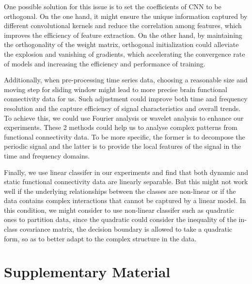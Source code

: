 \documentclass[11pt]{article}
\renewcommand\thesection{\arabic{section}}
\begin{document}
One possible solution for this issue is to set the coefficients of CNN to be orthogonal. On the one hand, it might ensure the unique information captured by different convolutional kernels and reduce the correlation among features, which improves the efficiency of feature extraction. On the other hand, by maintaining the orthogonality of the weight matrix,  orthogonal initialization could alleviate the explosion and vanishing of gradients\cite{Achour2021-rl},  which accelerating the convergence rate of models and increasing the efficiency and performance of training.

Additionally, when pre-processing time series data, choosing a reasonable size and moving step for sliding window might lead to more precise brain functional connectivity data for us. Such adjustment could improve both time and frequency resolution and the capture efficiency of signal characteristics and overall trends\cite{Leiber2023-de}. To achieve this, we could use Fourier analysis\cite{Mantini2007-sv} or wavelet analysis\cite{Medda2016-vh} to enhance our experiments. These 2 methods could help us to analyse complex patterns from functional connectivity data. To be more specific, the former is to decompose the periodic signal and the latter is to provide the local features of the signal in the time and frequency domains\cite{Guo2022-dk}.

Finally, we use linear classifer in our experiments and find that both dynamic and static functional connectivity data are linearly separable. But this might not work well if the underlying relationships between the classes are non-linear or if the data contains complex interactions that cannot be captured by a linear model. In this condition, we might consider to use non-linear classifer such as quadratic ones to partition data, since the quadratic could consider the inequality of the in-class covariance matrix,  the decision boundary is allowed to take a quadratic form\cite{Rasero2018-hi}, so as to better adapt to the complex structure in the data.

\newpage



% 


\newpage

\appendix
\renewcommand\thesection{\Alph{section}}

\section{Supplementary Material}
\end{document}
